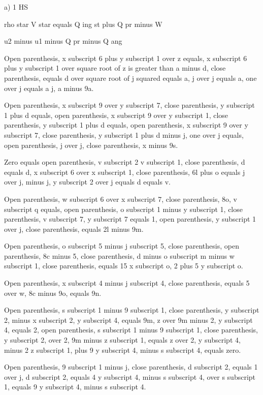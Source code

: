 a) 1 HS

rho star V star equals Q ing st plus Q pr minus W

u2 minus u1 minus Q pr minus Q ang

Open parenthesis, x subscript 6 plus y subscript 1 over z equals, x subscript 6 plus y subscript 1 over square root of z is greater than a minus d, close parenthesis, equals d over square root of j squared equals a, j over j equals a, one over j equals a j, a minus 9a.

Open parenthesis, x subscript 9 over y subscript 7, close parenthesis, y subscript 1 plus d equals, open parenthesis, x subscript 9 over y subscript 1, close parenthesis, y subscript 1 plus d equals, open parenthesis, x subscript 9 over y subscript 7, close parenthesis, y subscript 1 plus d minus j, one over j equals, open parenthesis, j over j, close parenthesis, x minus 9s.

Zero equals open parenthesis, v subscript 2 v subscript 1, close parenthesis, d equals d, x subscript 6 over x subscript 1, close parenthesis, 6l plus o equals j over j, minus j, y subscript 2 over j equals d equals v.

Open parenthesis, w subscript 6 over x subscript 7, close parenthesis, 8o, v subscript q equals, open parenthesis, o subscript 1 minus y subscript 1, close parenthesis, v subscript 7, y subscript 7 equals 1, open parenthesis, y subscript 1 over j, close parenthesis, equals 2l minus 9m.

Open parenthesis, o subscript 5 minus j subscript 5, close parenthesis, open parenthesis, 8c minus 5, close parenthesis, d minus o subscript m minus w subscript 1, close parenthesis, equals 15 x subscript o, 2 plus 5 y subscript o.

Open parenthesis, x subscript 4 minus j subscript 4, close parenthesis, equals 5 over w, 8c minus 9o, equals 9n.

Open parenthesis, s subscript 1 minus 9 subscript 1, close parenthesis, y subscript 2, minus x subscript 2, y subscript 4, equals 9m, z over 9m minus 2, y subscript 4, equals 2, open parenthesis, s subscript 1 minus 9 subscript 1, close parenthesis, y subscript 2, over 2, 9m minus z subscript 1, equals z over 2, y subscript 4, minus 2 z subscript 1, plus 9 y subscript 4, minus s subscript 4, equals zero.

Open parenthesis, 9 subscript 1 minus j, close parenthesis, d subscript 2, equals 1 over j, d subscript 2, equals 4 y subscript 4, minus s subscript 4, over s subscript 1, equals 9 y subscript 4, minus s subscript 4.

